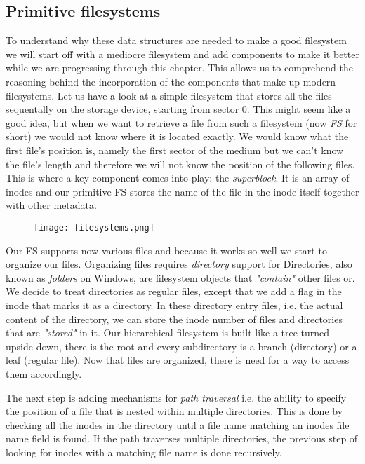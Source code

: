 \begin{enumerate}
\subsection{Primitive filesystems}

To understand why these data structures are needed to make a good filesystem we will start off with a
mediocre filesystem and add components to make it better while we are progressing through this chapter. 
This allows us to comprehend the reasoning behind the incorporation of the components that make up modern filesystems.
Let us have a look at a simple filesystem that stores all the files sequentally on the storage device,
starting from sector 0. This might seem like a good idea, but when we want to retrieve a file from
such a filesystem (now \textit{FS} for short) we would not know where it is located exactly. We would know
what the first file's position is, namely the first sector of the medium but we can't know the file's
length and therefore we will not know the  position of the following files. This is where a key component
comes into play: the \textit{superblock}. It is an array of inodes and our primitive FS stores the name of
the file in the inode itself together with other metadata.

\begin{figure}[h]
	\texttt{[image: filesystems.png]}
	\centering
\end{figure}

Our FS supports now various files and
because it works so well we start to organize our files. Organizing files requires \textit{directory}
support for Directories, also known as \textit{folders} on Windows, are filesystem objects that
\textit{"contain"} other files or. We decide to treat directories as regular files, except that we
add a flag in the inode that marks it as a directory. In these directory entry files, i.e. the actual
content of the directory, we can store the inode number of files and directories that are \textit{"stored"}
in it. Our hierarchical filesystem is built like a tree turned upside down, there is the root and every
subdirectory is a branch (directory) or a leaf (regular file). Now that files are organized, there is need
for a way to access them accordingly.

The next step is adding mechanisms for \textit{path traversal} i.e. the
ability to specify the position of a file that is nested within multiple directories. This is done by
checking all the inodes in the directory until a file name matching an inodes file name field is
found. If the path traverses multiple directories, the previous step of looking for inodes with a
matching file name is done recursively.


\end{enumerate}
